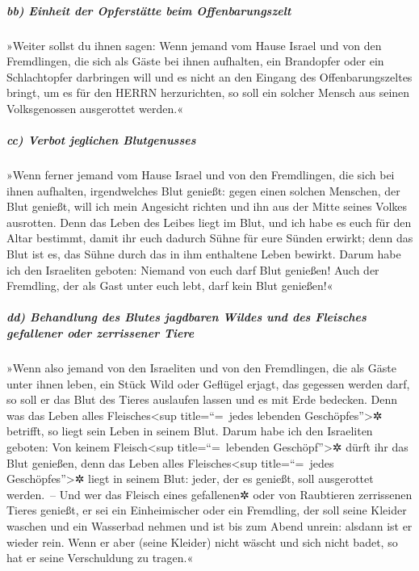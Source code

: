 \hypertarget{bb-einheit-der-opferstuxe4tte-beim-offenbarungszelt}{%
\subparagraph{bb) Einheit der Opferstätte beim
Offenbarungszelt}\label{bb-einheit-der-opferstuxe4tte-beim-offenbarungszelt}}

»Weiter sollst du ihnen sagen: Wenn jemand vom Hause
Israel und von den Fremdlingen, die sich als Gäste bei ihnen aufhalten,
ein Brandopfer oder ein Schlachtopfer darbringen will und
es nicht an den Eingang des Offenbarungszeltes bringt, um es für den
HERRN herzurichten, so soll ein solcher Mensch aus seinen Volksgenossen
ausgerottet werden.«

\hypertarget{cc-verbot-jeglichen-blutgenusses}{%
\subparagraph{cc) Verbot jeglichen
Blutgenusses}\label{cc-verbot-jeglichen-blutgenusses}}

»Wenn ferner jemand vom Hause Israel und von den
Fremdlingen, die sich bei ihnen aufhalten, irgendwelches Blut genießt:
gegen einen solchen Menschen, der Blut genießt, will ich mein Angesicht
richten und ihn aus der Mitte seines Volkes ausrotten.
Denn das Leben des Leibes liegt im Blut, und ich habe es
euch für den Altar bestimmt, damit ihr euch dadurch Sühne für eure
Sünden erwirkt; denn das Blut ist es, das Sühne durch das in ihm
enthaltene Leben bewirkt. Darum habe ich den Israeliten
geboten: Niemand von euch darf Blut genießen! Auch der Fremdling, der
als Gast unter euch lebt, darf kein Blut genießen!«

\hypertarget{dd-behandlung-des-blutes-jagdbaren-wildes-und-des-fleisches-gefallener-oder-zerrissener-tiere}{%
\subparagraph{dd) Behandlung des Blutes jagdbaren Wildes und des
Fleisches gefallener oder zerrissener
Tiere}\label{dd-behandlung-des-blutes-jagdbaren-wildes-und-des-fleisches-gefallener-oder-zerrissener-tiere}}

»Wenn also jemand von den Israeliten und von den
Fremdlingen, die als Gäste unter ihnen leben, ein Stück Wild oder
Geflügel erjagt, das gegessen werden darf, so soll er das Blut des
Tieres auslaufen lassen und es mit Erde bedecken. Denn
was das Leben alles Fleisches\textless sup title=``=~jedes lebenden
Geschöpfes''\textgreater✲ betrifft, so liegt sein Leben in seinem Blut.
Darum habe ich den Israeliten geboten: Von keinem Fleisch\textless sup
title=``=~lebenden Geschöpf''\textgreater✲ dürft ihr das Blut genießen,
denn das Leben alles Fleisches\textless sup title=``=~jedes
Geschöpfes''\textgreater✲ liegt in seinem Blut: jeder, der es genießt,
soll ausgerottet werden.~-- Und wer das Fleisch eines
gefallenen✲ oder von Raubtieren zerrissenen Tieres genießt, er sei ein
Einheimischer oder ein Fremdling, der soll seine Kleider waschen und ein
Wasserbad nehmen und ist bis zum Abend unrein: alsdann ist er wieder
rein. Wenn er aber (seine Kleider) nicht wäscht und sich
nicht badet, so hat er seine Verschuldung zu tragen.«

